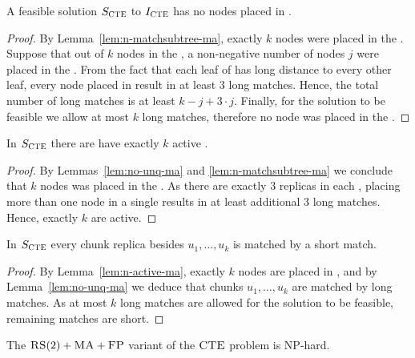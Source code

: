 \begin{lemma}
  A feasible solution $S_{\mathrm{\textsc{CTE}}}$ to $I_{\mathrm{\textsc{CTE}}}$ has no nodes placed in \UnqGadget{}.
  \label{lem:no-unq-ma}
\end{lemma}
\begin{proof}
  By Lemma~\ref{lem:n-matchsubtree-ma}, exactly $k$ nodes were placed in the \MatchSubtree{}.
Suppose that out of $k$ nodes in the \MatchSubtree{}, a non-negative number of nodes $j$ were placed in the \UnqGadgets{}.
From the fact that each leaf of \UnqGadget{} has long distance to every other leaf, every node placed in \UnqGadget{} result in at least $3$ long matches.
Hence, the total number of long matches is at least $k-j + 3\cdot j$.
Finally, for the solution to be feasible we allow at most $k$ long matches, therefore no node was placed in the \UnqGadget{}.
\end{proof}

\begin{lemma}
  In $S_{\mathrm{\textsc{CTE}}}$ there are have exactly $k$ active \TripleGadgets{}.
  \label{lem:n-active-ma}
\end{lemma}
\begin{proof}
  By Lemmas~\ref{lem:no-unq-ma} and \ref{lem:n-matchsubtree-ma} we conclude that $k$ nodes was placed in the \TripleGadgets.
As there are exactly $3$ replicas in each \TripleGadget{}, placing more than one node in a single \TripleGadget{} results in at least additional $3$ long matches.
Hence, exactly $k$ \TripleGadgets{} are active.
\end{proof}

\begin{lemma}
  In $S_{\mathrm{\textsc{CTE}}}$ every chunk replica besides $u_1, \ldots, u_k$ is matched by a short match.
  \label{lem:short-ma}
\end{lemma}
\begin{proof}
  By Lemma~\ref{lem:n-active-ma}, exactly $k$ nodes are placed in \TripleGadgets{}, and by Lemma~\ref{lem:no-unq-ma} we deduce that chunks $u_1, \ldots, u_k$ are matched by long matches.
  As at most $k$ long matches are allowed for the solution to be feasible, remaining matches are short.
\end{proof}

\begin{theorem}
  The $\textsc{RS}(2)+\textsc{MA}+\textsc{FP}$ variant of the $\textsc{CTE}$ problem is NP-hard.
  \label{th:ma-reduction}
\end{theorem}

